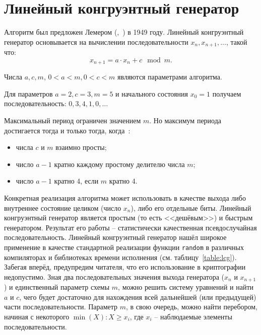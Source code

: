 \section{Линейный конгруэнтный генератор}\label{section-linear-congruential-generator}

Алгоритм был предложен Лемером (,~\cite{Lehmer:1951:1, Lehmer:1951:2}) в 1949 году. Линейный конгруэнтный генератор основывается на вычислении последовательности $x_n, x_{n+1}, \dots$, такой что:
	\[x_{n+1} = a \cdot x_n + c \mod m.\]

Числа $a, c, m$, $ 0 < a < m, 0 < c < m$ являются параметрами алгоритма.

\example
Для параметров $a = 2, c = 3, m = 5$ и начального состояния $x_0 = 1$ получаем последовательность: $0, 3, 4, 1, 0, \dots$
\exampleend

Максимальный период ограничен значением $m$. Но максимум периода достигается тогда и только тогда, когда~\cite[Линейный конгруэнтный метод]{Knuth:2001:2}:

\begin{itemize}
	\item числа $c$ и $m$ взаимно просты;
	\item число $a - 1$ кратно каждому простому делителю числа $m$;
	\item число $a - 1$ кратно 4, если $m$ кратно 4.
\end{itemize}

Конкретная реализация алгоритма может использовать в качестве выхода либо внутреннее состояние целиком (число $x_n$), либо его отдельные биты. Линейный конгруэнтный генератор является простым (то есть <<дешёвым>>) и быстрым генератором. Результат его работы -- статистически качественная псевдослучайная последовательность. Линейный конгруэнтный генератор нашёл широкое применение в качестве стандартной реализации функции \texttt{random} в различных компиляторах и библиотеках времени исполнения (см. таблицу~\ref{table:lcg}). Забегая вперёд, предупредим читателя, что его использование в криптографии недопустимо. Зная два последовательных значения выхода генератора ($x_n$ и $x_{n+1}$) и единственный параметр схемы $m$, можно решить систему уравнений и найти $a$ и $c$, чего будет достаточно для нахождения всей дальнейшей (или предыдущей) части последовательности. Параметр $m$, в свою очередь, можно найти перебором, начиная с некоторого $\min(X): X \geq x_i$, где $x_i$ -- наблюдаемые элементы последовательности.

